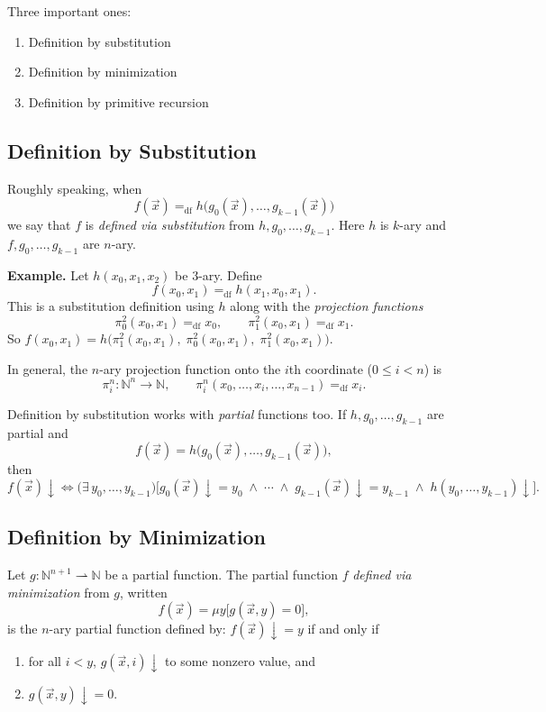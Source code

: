 \documentclass[11pt]{article}
\begin{document}
Three important ones:
\begin{enumerate}[leftmargin=1.8em]
    \item Definition by substitution
    \item Definition by minimization
    \item Definition by primitive recursion
\end{enumerate}

\subsection{Definition by Substitution}

Roughly speaking, when
\[
    f(\vec{x}) =_{\mathrm{df}} h\bigl(g_0(\vec{x}), \dots, g_{k-1}(\vec{x})\bigr)
\]
we say that $f$ is \emph{defined via substitution} from $h, g_0, \dots, g_{k-1}$. Here $h$ is $k$-ary and $f, g_0, \dots, g_{k-1}$ are $n$-ary.

\textbf{Example.} Let $h(x_0, x_1, x_2)$ be $3$-ary. Define
\[
    f(x_0, x_1) =_{\mathrm{df}} h(x_1, x_0, x_1).
\]
This is a substitution definition using $h$ along with the \emph{projection functions}
\[
    \pi^2_0(x_0, x_1) =_{\mathrm{df}} x_0, \qquad \pi^2_1(x_0, x_1) =_{\mathrm{df}} x_1.
\]
So $f(x_0, x_1) = h\bigl(\pi^2_1(x_0, x_1),\; \pi^2_0(x_0, x_1),\; \pi^2_1(x_0, x_1)\bigr)$.

In general, the $n$-ary projection function onto the $i$th coordinate ($0 \le i < n$) is
\[
    \pi^n_i \colon \mathbb{N}^n \to \mathbb{N}, \qquad \pi^n_i(x_0, \dots, x_i, \dots, x_{n-1}) =_{\mathrm{df}} x_i.
\]

Definition by substitution works with \emph{partial} functions too. If $h, g_0, \dots, g_{k-1}$ are partial and
\[
    f(\vec{x}) = h\bigl(g_0(\vec{x}), \dots, g_{k-1}(\vec{x})\bigr),
\]
then
\[
    f(\vec{x}){\downarrow} \iff \bigl(\exists\, y_0, \dots, y_{k-1}\bigr)\bigl[g_0(\vec{x}){\downarrow}= y_0 \;\land\; \cdots \;\land\; g_{k-1}(\vec{x}){\downarrow}= y_{k-1} \;\land\; h(y_0, \dots, y_{k-1}){\downarrow}\bigr].
\]

\subsection{Definition by Minimization}

Let $g\colon \mathbb{N}^{n+1} \rightharpoonup \mathbb{N}$ be a partial function. The partial function $f$ \emph{defined via minimization} from $g$, written
\[
    f(\vec{x}) = \mu y\bigl[g(\vec{x}, y) = 0\bigr],
\]
is the $n$-ary partial function defined by: $f(\vec{x}){\downarrow}= y$ if and only if
\begin{enumerate}[leftmargin=1.8em, label=(\roman*)]
    \item for all $i < y$, $g(\vec{x}, i){\downarrow}$ to some nonzero value, and
    \item $g(\vec{x}, y){\downarrow}= 0$.
\end{enumerate}
\end{document}
